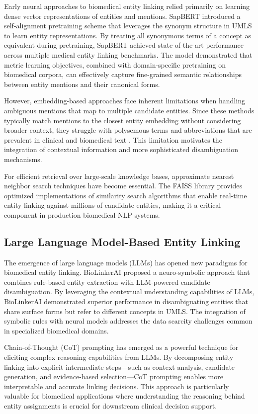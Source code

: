 Early neural approaches to biomedical entity linking relied primarily on learning dense vector representations of entities and mentions. SapBERT \cite{liu2021sapbert} introduced a self-alignment pretraining scheme that leverages the synonym structure in UMLS to learn entity representations. By treating all synonymous terms of a concept as equivalent during pretraining, SapBERT achieved state-of-the-art performance across multiple medical entity linking benchmarks. The model demonstrated that metric learning objectives, combined with domain-specific pretraining on biomedical corpora, can effectively capture fine-grained semantic relationships between entity mentions and their canonical forms.

However, embedding-based approaches face inherent limitations when handling ambiguous mentions that map to multiple candidate entities. Since these methods typically match mentions to the closest entity embedding without considering broader context, they struggle with polysemous terms and abbreviations that are prevalent in clinical and biomedical text \cite{wu2017abbr}. This limitation motivates the integration of contextual information and more sophisticated disambiguation mechanisms.

For efficient retrieval over large-scale knowledge bases, approximate nearest neighbor search techniques have become essential. The FAISS library \cite{douze2024faiss} provides optimized implementations of similarity search algorithms that enable real-time entity linking against millions of candidate entities, making it a critical component in production biomedical NLP systems.

\subsection{Large Language Model-Based Entity Linking}

The emergence of large language models (LLMs) has opened new paradigms for biomedical entity linking. BioLinkerAI \cite{biolinkerai2025} proposed a neuro-symbolic approach that combines rule-based entity extraction with LLM-powered candidate disambiguation. By leveraging the contextual understanding capabilities of LLMs, BioLinkerAI demonstrated superior performance in disambiguating entities that share surface forms but refer to different concepts in UMLS. The integration of symbolic rules with neural models addresses the data scarcity challenges common in specialized biomedical domains.

Chain-of-Thought (CoT) prompting \cite{wei2022cot} has emerged as a powerful technique for eliciting complex reasoning capabilities from LLMs. By decomposing entity linking into explicit intermediate steps—such as context analysis, candidate generation, and evidence-based selection—CoT prompting enables more interpretable and accurate linking decisions. This approach is particularly valuable for biomedical applications where understanding the reasoning behind entity assignments is crucial for downstream clinical decision support.

